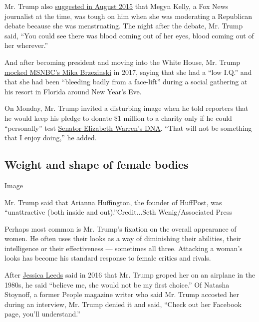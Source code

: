Mr. Trump also
\href{https://www.nytimes3xbfgragh.onion/2015/08/09/us/politics/donald-trump-disinvited-from-conservative-event-over-remark-on-megyn-kelly.html?module=inline}{suggested
in August 2015} that Megyn Kelly, a Fox News journalist at the time, was
tough on him when she was moderating a Republican debate because she was
menstruating. The night after the debate, Mr. Trump said, ``You could
see there was blood coming out of her eyes, blood coming out of her
wherever.''

And after becoming president and moving into the White House, Mr. Trump
\href{https://www.nytimes3xbfgragh.onion/2017/06/29/business/media/trump-mika-brzezinski-facelift.html}{mocked
MSNBC's Mika Brzezinski} in 2017, saying that she had a ``low I.Q.'' and
that she had been ``bleeding badly from a face-lift'' during a social
gathering at his resort in Florida around New Year's Eve.

On Monday, Mr. Trump invited a disturbing image when he told reporters
that he would keep his pledge to donate \$1 million to a charity only if
he could ``personally'' test
\href{https://www.nytimes3xbfgragh.onion/2018/10/15/us/politics/elizabeth-warren-dna-ancestry.html}{Senator
Elizabeth Warren's DNA}. ``That will not be something that I enjoy
doing,'' he added.

\hypertarget{weight-and-shape-of-female-bodies}{%
\subsection{Weight and shape of female
bodies}\label{weight-and-shape-of-female-bodies}}

Image

Mr. Trump said that Arianna Huffington, the founder of HuffPost, was
``unattractive (both inside and out).''Credit...Seth Wenig/Associated
Press

Perhaps most common is Mr. Trump's fixation on the overall appearance of
women. He often uses their looks as a way of diminishing their
abilities, their intelligence or their effectiveness --- sometimes all
three. Attacking a woman's looks has become his standard response to
female critics and rivals.

After
\href{https://www.nytimes3xbfgragh.onion/2016/10/15/us/politics/donald-trump-campaign.html}{Jessica
Leeds} said in 2016 that Mr. Trump groped her on an airplane in the
1980s, he said ``believe me, she would not be my first choice.'' Of
Natasha Stoynoff, a former People magazine writer who said Mr. Trump
accosted her during an interview, Mr. Trump denied it and said, ``Check
out her Facebook page, you'll understand.''

